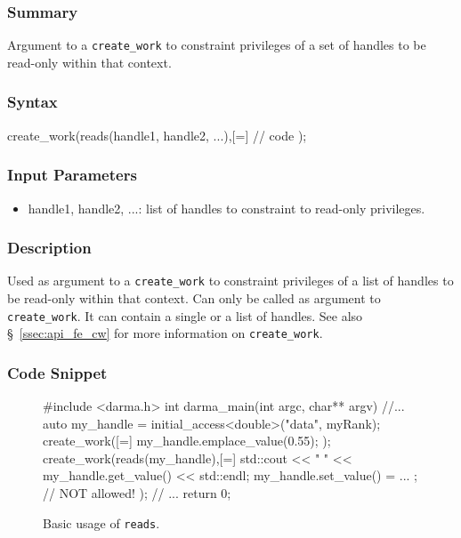 \hspace{0.1cm} %
\begin{subs}
\vspace{-1.2cm}

\subsubsection{Summary} 
Argument to a \texttt{create\_work} to constraint 
privileges of a set of handles to be read-only within that context.

\subsubsection{Syntax} 
\begin{CppCode}
create_work(reads(handle1, handle2, ...),[=]{
	// code 
});
\end{CppCode}

\subsubsection{Input Parameters} 
\begin{itemize}
\item handle1, handle2, ...: list of handles to 
constraint to read-only privileges.
\end{itemize}

\subsubsection{Description} 
Used as argument to a \texttt{create\_work} to constraint 
privileges of a list of handles to be read-only within that context.
Can only be called as argument to \texttt{create\_work}. 
It can contain a single or a list of handles. 
See also \S~\ref{ssec:api_fe_cw} for more information on \texttt{create\_work}.


\subsubsection{Code Snippet} 
\begin{figure}[!h]
\begin{CppCodeNumb}
#include <darma.h>
int darma_main(int argc, char** argv)
{
	//...
  auto my_handle = initial_access<double>("data", myRank);
  create_work([=]{
    my_handle.emplace_value(0.55);
  });
  create_work(reads(my_handle),[=]{
    std::cout << " " << my_handle.get_value() << std::endl;
    my_handle.set_value() = ... ; // NOT allowed!
  });
  // ... 
  return 0;
}
\end{CppCodeNumb}
\label{fig:fe_api_initialaccess}
\caption{Basic usage of \texttt{reads}.}
\end{figure}

\end{subs}





